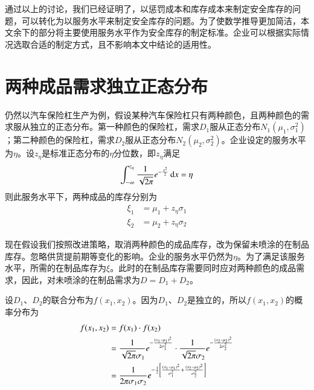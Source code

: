 通过以上的讨论，我们已经证明了，以惩罚成本和库存成本来制定安全库存的问题，可以转化为以服务水平来制定安全库存的问题。为了使数学推导更加简洁，本文余下的部分将主要使用服务水平作为安全库存的制定标准。企业可以根据实际情况选取合适的制定方式，且不影响本文中结论的适用性。












\section{两种成品需求独立正态分布}

仍然以汽车保险杠生产为例，假设某种汽车保险杠只有两种颜色，且两种颜色的需求服从独立的正态分布。第一种颜色的保险杠，需求$D_1$服从正态分布$N_1(\mu_1,\sigma_1^2)$；第二种颜色的保险杠，需求$D_2$服从正态分布$N_2(\mu_2,\sigma_2^2)$。企业设定的服务水平为$\eta$。设$z_\eta$是标准正态分布的$\eta$分位数，即$z_\eta$满足
\[
\int_{-\infty}^{z_\eta}\frac{1}{\sqrt{2\pi}}e^{-\frac{x^2}{2}}\operatorname{d\!} x = \eta
\]
则此服务水平下，两种成品的库存分别为
\begin{align}
\xi_1 &= \mu_1 + z_\eta\sigma_1 \label{eq:成品库存1}\\
\xi_2 &= \mu_2 + z_\eta\sigma_2 \label{eq:成品库存2}
\end{align}

现在假设我们按照改进策略，取消两种颜色的成品库存，改为保留未喷涂的在制品库存。忽略供货提前期等变化的影响。企业的服务水平仍然为$\eta$。为了满足该服务水平，所需的在制品库存为$\xi$。此时的在制品库存需要同时应对两种颜色的成品需求，因此，对未喷涂的在制品需求为$D=D_1+D_2$。

设$D_1$、$D_2$的联合分布为$f(x_1,x_2)$。因为$D_1$、$D_2$是独立的，所以$f(x_1,x_2)$的概率分布为
\begin{align}
f(x_1,x_2) &= f(x_1)\cdot f(x_2) \notag\\
&= \frac{1}{\sqrt{2\pi}\sigma_1}e^{-\frac{(x_1-\mu_1)^2}{2\sigma_1^2}}\cdot \frac{1}{\sqrt{2\pi}\sigma_2}e^{-\frac{(x_2-\mu_2)^2}{2\sigma_2^2}} \notag\\
&= \frac{1}{2\pi\sigma_1\sigma_2}e^{-\frac{1}{2}\left[\frac{(x_1-\mu_1)^2}{\sigma_1^2}+\frac{(x_2-\mu_2)^2}{\sigma_2^2}\right]}
\label{eq:联合分布}
\end{align}

